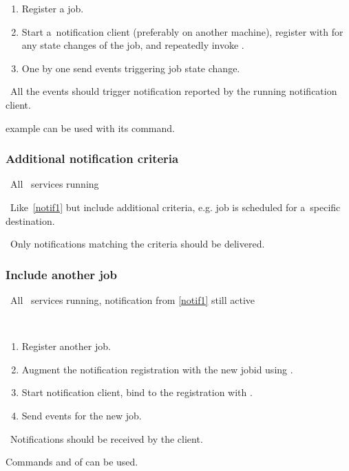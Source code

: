 \how
\begin{enumerate}
\item Register a job. 
\item Start a~notification client (preferably on another machine),
register with  for any state changes of the job, 
and repeatedly invoke .
\item One by one send events triggering job state change. 
\end{enumerate}

\result\ All the events should trigger notification reported by the running
notification client.

\begin{hints}
 example can be used with its  command.
\end{hints}

\subsubsection{Additional notification criteria}
\label{notif-complex}
\req\ All \LB\ services running

\how\ Like~\ref{notif1} but include additional criteria,
e.g. job is scheduled for a~specific destination.

\result\ Only notifications matching the criteria should be delivered.

\subsubsection{Include another job}
\label{notif2}
\req\ All \LB\ services running, notification from \ref{notif1} still active

\how\ 
\begin{enumerate}
\item Register another job.
\item Augment the notification registration with the new jobid using
\code{edg\_wll\_NotifChange}.
\item Start notification client, bind to the registration with
.
\item Send events for the new job.
\end{enumerate}

\result\ Notifications should be received by the client.

\begin{hints}
Commands  and  of 
can be used.
\end{hints}

